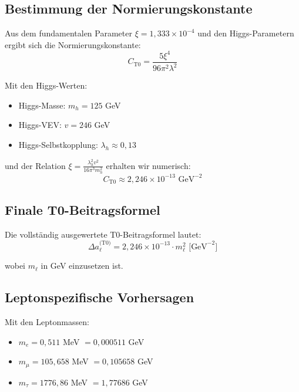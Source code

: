 	\subsection{Bestimmung der Normierungskonstante}
	
	Aus dem fundamentalen Parameter $\xi = 1{,}333 \times 10^{-4}$ und den Higgs-Parametern ergibt sich die Normierungskonstante:
	\begin{equation}
		C_{\text{T0}} = \frac{5\xi^4}{96\pi^2\lambda^2}
		\label{eq:normalization_constant}
	\end{equation}
	
	Mit den Higgs-Werten:
	\begin{itemize}
		\item Higgs-Masse: $m_h = 125$ GeV
		\item Higgs-VEV: $v = 246$ GeV  
		\item Higgs-Selbstkopplung: $\lambda_h \approx 0{,}13$
	\end{itemize}
	
	und der Relation $\xi = \frac{\lambda_h^2 v^2}{16\pi^3 m_h^2}$ erhalten wir numerisch:
	\begin{equation}
		C_{\text{T0}} \approx 2{,}246 \times 10^{-13} \text{ GeV}^{-2}
		\label{eq:numerical_constant}
	\end{equation}
	
	\subsection{Finale T0-Beitragsformel}
	
	Die vollständig ausgewertete T0-Beitragsformel lautet:
	\begin{equation}
		\boxed{\Delta a_\ell^{\text{(T0)}} = 2{,}246 \times 10^{-13} \cdot m_\ell^2 \text{ [GeV}^{-2}\text{]}}
		\label{eq:final_t0_formula}
	\end{equation}
	
	wobei $m_\ell$ in GeV einzusetzen ist.
	
	\subsection{Leptonspezifische Vorhersagen}
	
	Mit den Leptonmassen:
	\begin{itemize}
		\item $m_e = 0{,}511$ MeV $= 0{,}000511$ GeV
		\item $m_\mu = 105{,}658$ MeV $= 0{,}105658$ GeV
		\item $m_\tau = 1776{,}86$ MeV $= 1{,}77686$ GeV
	\end{itemize}
	
